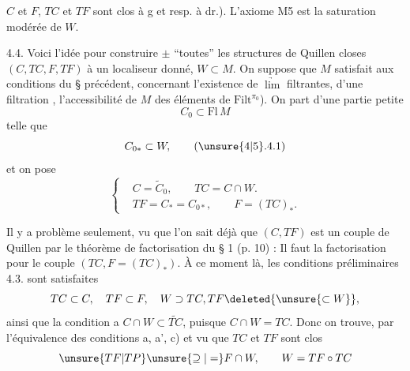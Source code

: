 $C$ et $F$, $TC$ et $TF$ sont clos à g et resp. à dr.). L'axiome
M5 est la saturation  modérée de $W$.

4.4. Voici l'idée pour construire $\pm$ ``toutes'' les
 structures de Quillen closes
$(C,TC,F,TF)$  à un localiseur donné,
$W\subset M$. On suppose que $M$ satisfait aux
conditions du § précédent, concernant l'existence
de $\underrightarrow{\lim}$ filtrantes, d'une filtration ,
l'accessibilité de $M$   des éléments de
$\mathrm{Filt}^{\pi_0}$). On part d'une partie petite
\[
C_0\subset\mathrm{Fl}\,M
\]
telle que
\[
C_{0*}\subset W,\tag*{(\unsure{4|5}.4.1)}
\]
et on pose
\[
\left\{\begin{aligned}
&C=\widetilde C_0,\qquad TC=C\cap W.\\
&TF=C_*=C_{0*},\qquad F=(TC)_*.
\end{aligned}\right.\tag*{(4.4.2.)}
\]

Il y a   problème seulement, vu
que l'on sait déjà que $(C,TF)$ est un
couple de Quillen par le théorème de factorisation
du § 1 (p. 10) : Il faut la factorisation pour
le couple $(TC,F=(TC)_*)$. À ce moment là,
les conditions préliminaires 
 4.3. sont
satisfaites
\[
TC\subset C,\quad TF\subset F,\quad W\supset TC,TF\deleted{\unsure{\subset W}},
\]
ainsi que la condition a \quad $C\cap W\subset\widetilde{TC}$, puisque
$C\cap W=TC$. Donc on trouve, par l'équivalence
des conditions a, a', c) et vu que $TC$ et $TF$ sont clos
\[
\unsure{TF|TP}\unsure{\supseteq|=} F\cap W,\qquad W=TF\circ TC
\]
